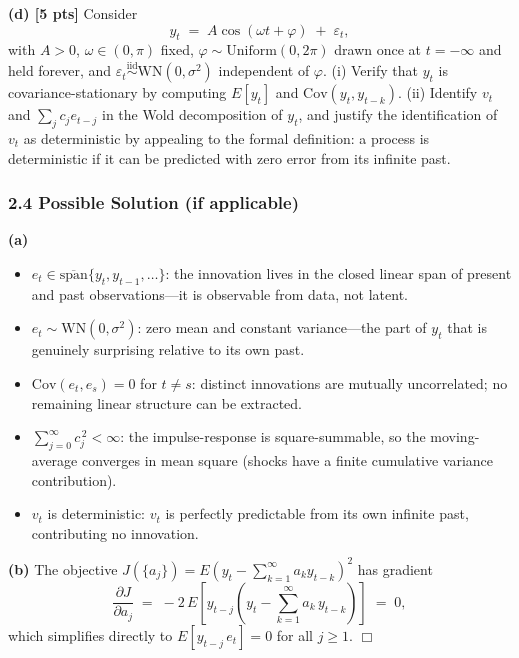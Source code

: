 \documentclass[11pt]{article}
\begin{document}
\textbf{(d) [5 pts]} Consider
\[
y_t \;=\; A\cos(\omega t + \varphi) \;+\; \varepsilon_t,
\]
with $A>0$, $\omega \in (0,\pi)$ fixed, $\varphi \sim \mathrm{Uniform}(0, 2\pi)$ drawn once at $t=-\infty$ and held forever, and $\varepsilon_t \overset{\text{iid}}{\sim} \mathrm{WN}(0, \sigma^2)$ independent of $\varphi$. (i) Verify that $y_t$ is covariance-stationary by computing $E[y_t]$ and $\mathrm{Cov}(y_t, y_{t-k})$. (ii) Identify $v_t$ and $\sum_j c_j e_{t-j}$ in the Wold decomposition of $y_t$, and justify the identification of $v_t$ as deterministic by appealing to the formal definition: a process is deterministic if it can be predicted with zero error from its infinite past.

\subsubsection*{2.4 Possible Solution (if applicable)}
\textbf{(a)}
\begin{itemize}\setlength\itemsep{0pt}
\item $e_t \in \overline{\mathrm{span}}\{y_t, y_{t-1}, \ldots\}$: the innovation lives in the closed linear span of present and past observations---it is observable from data, not latent.
\item $e_t \sim \mathrm{WN}(0, \sigma^2)$: zero mean and constant variance---the part of $y_t$ that is genuinely surprising relative to its own past.
\item $\mathrm{Cov}(e_t, e_s) = 0$ for $t \neq s$: distinct innovations are mutually uncorrelated; no remaining linear structure can be extracted.
\item $\sum_{j=0}^{\infty} c_j^{\,2} < \infty$: the impulse-response is square-summable, so the moving-average converges in mean square (shocks have a finite cumulative variance contribution).
\item $v_t$ is deterministic: $v_t$ is perfectly predictable from its own infinite past, contributing no innovation.
\end{itemize}

\textbf{(b)} The objective $J(\{a_j\}) = E\!\left(y_t - \sum_{k=1}^{\infty} a_k y_{t-k}\right)^{2}$ has gradient
\[
\frac{\partial J}{\partial a_j} \;=\; -2\, E\!\left[ y_{t-j}\!\left(y_t - \sum_{k=1}^{\infty} a_k\, y_{t-k}\right) \right] \;=\; 0,
\]
which simplifies directly to $E[y_{t-j}\, e_t] = 0$ for all $j \geq 1$. \hfill$\Box$
\end{document}
